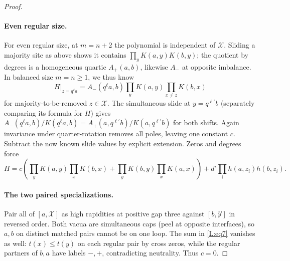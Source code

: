 \begin{proof}
\paragraph{Even regular size.}
For even regular size, at \(m=n+2\) the polynomial is independent of \(\mathcal X\). Sliding a majority site as above shows it contains \(\prod_y K(a,y)K(b,y)\); the quotient by degrees is a homogeneous quartic \(A_+(a,b)\), likewise \(A_-\) at opposite imbalance. In balanced size \(m=n\ge1\), we thus know
\[
 H|_{z=q^\ell a}=A_-(q^\ell a,b)\prod_y K(a,y)\prod_{x\ne z}K(b,x)
\]
for majority-to-be-removed \(z\in\mathcal X\). The simultaneous slide at \(y=q^{\ell'}b\) (separately comparing its formula for \(H\)) gives \(A_-(q^\ell a,b)/K(q^\ell a,b)=A_+(a,q^{\ell'}b)/K(a,q^{\ell'}b)\) for both shifts. Again invariance under quarter-rotation removes all poles, leaving one constant \(c\). Subtract the now known slide values by explicit extension. Zeros and degrees force
\[
 H=c\left(\prod_y K(a,y)\prod_x K(b,x)+\prod_y K(b,y)\prod_x K(a,x)\right)
     +d'\prod_i h(a,z_i)h(b,z_i).
\]
\paragraph{The two paired specializations.}
Pair all of \([a,\mathcal X]\) as high rapidities at positive gap three against \([b,\mathcal Y]\) in reversed order. Both vacua are simultaneous caps (peel at opposite interfaces), so \(a,b\) on distinct matched pairs cannot be on one loop. The sum in \eqref{L:eq7} vanishes as well: \(t(x)\le t(y)\) on each regular pair by cross zeros, while the regular partners of \(b,a\) have labels \(-,+\), contradicting neutrality. Thus \(c=0\).


\end{proof}
